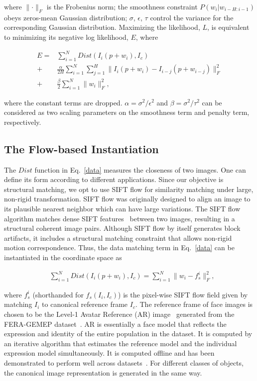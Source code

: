 \documentclass[10pt,journal]{IEEEtran}
\begin{document}
\noindent where $\parallel \cdot \parallel_F$ is the Frobenius norm; the smoothness constraint $P(w_i|w_{i-H:i-1})$ obeys zeros-mean Gaussian distribution; $\sigma$, $\epsilon$, $\tau$ control the variance for the corresponding Gaussian distribution. Maximizing the likelihood, $L$, is equivalent to minimizing its negative log likelihood, $E$, where

\begin{align}
\label{data}
E = &\sum_{i=1}^{N}Dist(I_i(p+w_i),I_c) \\
\label{smooth}
	+ &\frac{\alpha}{2H}\sum_{i=1}^{N}\sum_{j=1}^{H}\parallel{I_i(p+w_i)-I_{i-j}(p+w_{i-j})}\parallel_F^2 \\
\label{penalty}
	+ &\frac{\beta}{2}\sum_{i=1}^{N}\parallel{w_i}\parallel_F^2,
\end{align}


\noindent where the constant terms are dropped. $\alpha=\sigma^2 / \epsilon^2$ and $\beta=\sigma^2 / \tau^2$ can be considered as two scaling parameters on the smoothness term and penalty term, respectively. 

\subsection{\label{sec:model}The Flow-based Instantiation}

The $Dist$ function in Eq.~\eqref{data} measures the closeness of two images. One can define its form according to different applications. Since our objective is structural matching, we opt to use SIFT flow \cite{Liu_PAMI11} for similarity matching under large, non-rigid transformation. SIFT flow \cite{Liu_PAMI11} was originally designed to align an image to its plausible nearest neighbor which can have large variations. The SIFT flow algorithm matches dense SIFT features~\cite{SIFT} between two images, resulting in a structural coherent image pairs. Although SIFT flow by itself generates block artifacts, it includes a structural matching constraint that allows non-rigid motion correspondence. Thus, the data matching term in Eq.~\eqref{data} can be instantiated in the coordinate space as

\begin{align}
\label{data_sift}
&\sum_{i=1}^{N}Dist(I_i(p+w_i),I_c)=\sum_{i=1}^{N}\parallel{w_i-f_s^i}\parallel_F^2,
\end{align}

\noindent where $f_s^i$ (shorthanded for $f_s(I_i,I_c)$) is the pixel-wise SIFT flow field given by matching $I_i$ to canonical reference frame $I_c$. The reference frame of face images is chosen to be the Level-1 Avatar Reference (AR) image~\cite{Yang_SMCB12} generated from the FERA-GEMEP dataset~\cite{Valstar_FERA11}. AR is essentially a face model that reflects the expression and identity of the entire population in the dataset. It is computed by an iterative algorithm that estimates the reference model and the individual expression model simultaneously. It is computed offline and has been demonstrated to perform well across datasets~\cite{Yang_SMCB12}. For different classes of objects, the canonical image representation is generated in the same way.
\end{document}
